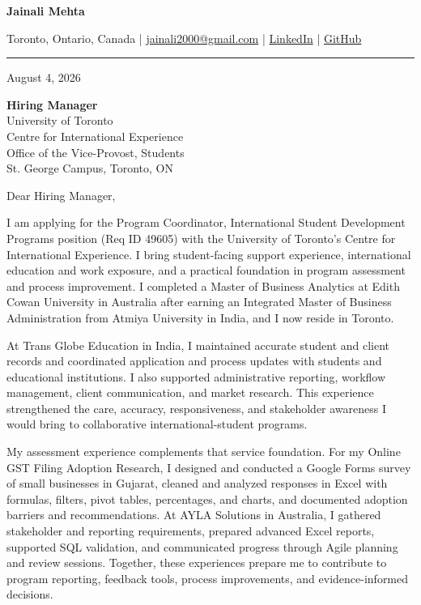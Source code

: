 \documentclass[letterpaper,10pt]{article}
\begin{document}
\begin{center}
  {\fontsize{17}{19}\selectfont\textbf{Jainali Mehta}}\par\vspace{2pt}
  \small Toronto, Ontario, Canada \;|\;
  \href{mailto:jainali2000@gmail.com}{jainali2000@gmail.com} \;|\;
  \href{https://www.linkedin.com/in/jainali-mehta}{LinkedIn} \;|\;
  \href{https://github.com/jainalimehta}{GitHub}
\end{center}
\vspace{-5pt}
\noindent\rule{\textwidth}{0.4pt}

August 4, 2026

\textbf{Hiring Manager}\\
University of Toronto\\
Centre for International Experience\\
Office of the Vice-Provost, Students\\
St. George Campus, Toronto, ON

Dear Hiring Manager,

I am applying for the Program Coordinator, International Student Development Programs position (Req ID 49605) with the University of Toronto's Centre for International Experience. I bring student-facing support experience, international education and work exposure, and a practical foundation in program assessment and process improvement. I completed a Master of Business Analytics at Edith Cowan University in Australia after earning an Integrated Master of Business Administration from Atmiya University in India, and I now reside in Toronto.

At Trans Globe Education in India, I maintained accurate student and client records and coordinated application and process updates with students and educational institutions. I also supported administrative reporting, workflow management, client communication, and market research. This experience strengthened the care, accuracy, responsiveness, and stakeholder awareness I would bring to collaborative international-student programs.

My assessment experience complements that service foundation. For my Online GST Filing Adoption Research, I designed and conducted a Google Forms survey of small businesses in Gujarat, cleaned and analyzed responses in Excel with formulas, filters, pivot tables, percentages, and charts, and documented adoption barriers and recommendations. At AYLA Solutions in Australia, I gathered stakeholder and reporting requirements, prepared advanced Excel reports, supported SQL validation, and communicated progress through Agile planning and review sessions. Together, these experiences prepare me to contribute to program reporting, feedback tools, process improvements, and evidence-informed decisions.
\end{document}
